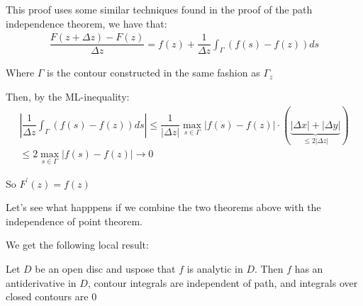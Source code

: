 \begin{prf}[]{}
  This proof uses some similar techniques found in the proof of the path independence theorem, we have that:
  \begin{equation*}
    \begin{gathered}
      \dfrac{F(z+\Delta z)-F(z)}{\Delta z} = f(z)+\dfrac{1}{\Delta z}\int_{\Gamma}(f(s)-f(z))ds
    \end{gathered}
  \end{equation*}\par
  \noindent Where $\Gamma$ is the contour constructed in the same fashion as $\Gamma_z$
  \par\bigskip
  \noindent Then, by the ML-inequality:
  \begin{equation*}
    \begin{gathered}
      \left|\dfrac{1}{\Delta z}\int_{\Gamma}(f(s)-f(z))ds\right|\leq\dfrac{1}{\left|\Delta z\right|}\max_{s\in\Gamma}\left|f(s)-f(z)\right|\cdot(\underbrace{\left|\Delta x\right|+\left|\Delta y\right|}_{\text{$\leq 2\left|\Delta z\right|$}})\\
      \leq 2\max_{s\in\Gamma}\left|f(s)-f(z)\right|\to0
    \end{gathered}
  \end{equation*}
  \par\bigskip
  \noindent So $F^{\prime}(z) = f(z)$
\end{prf}
\par\bigskip
\noindent Let's see what happpens if we combine the two theorems above with the independence of point theorem.\par
\noindent We get the following local result:
\par\bigskip
\begin{theo}[]{}
  Let $D$ be an open disc and uspose that $f$ is analytic in $D$. Then $f$ has an antiderivative in $D$, contour integrals are independent of path, and integrals over closed contours are 0 
\end{theo}
\par\bigskip
